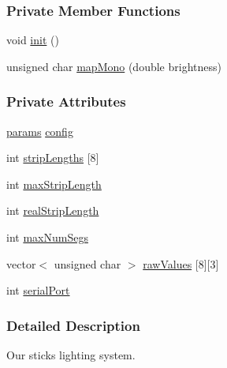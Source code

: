 \subsubsection*{\-Private \-Member \-Functions}
\begin{DoxyCompactItemize}
\item 
void \hyperlink{classSticks_a6db1929d8fc43c94377c6dbfafe5f55f}{init} ()
\item 
unsigned char \hyperlink{classSticks_abdbc514786c495286d6e0c6a83e33150}{map\-Mono} (double brightness)
\end{DoxyCompactItemize}
\subsubsection*{\-Private \-Attributes}
\begin{DoxyCompactItemize}
\item 
\hyperlink{structSticks_1_1params}{params} \hyperlink{classSticks_ad77454176517e28c47a4eba37c307d02}{config}
\item 
int \hyperlink{classSticks_a4f14013508b750816b5acfe029be7b6a}{strip\-Lengths} \mbox{[}8\mbox{]}
\item 
int \hyperlink{classSticks_a22fe70b7d473809d323df75cadf2581c}{max\-Strip\-Length}
\item 
int \hyperlink{classSticks_aee9f9b761688fb38972458e3d0c454ff}{real\-Strip\-Length}
\item 
int \hyperlink{classSticks_ab612d8d5a4dbc6e195f878dfa40f321d}{max\-Num\-Segs}
\item 
vector$<$ unsigned char $>$ \hyperlink{classSticks_add99fb5e5c554f78bd5fed3e0613b466}{raw\-Values} \mbox{[}8\mbox{]}\mbox{[}3\mbox{]}
\item 
int \hyperlink{classSticks_ae7c50972f44a386b5cd4dcf182f7550a}{serial\-Port}
\end{DoxyCompactItemize}


\subsubsection{\-Detailed \-Description}
\-Our sticks lighting system. 

